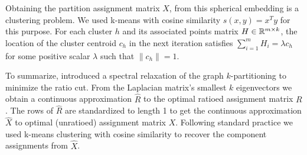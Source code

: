 Obtaining the partition assignment matrix $X$, from this spherical
embedding is a clustering problem. We used k-means with cosine
similarity $s(x,y) = x^T y$ for this purpose. For each cluster $h$
and its associated points matrix $H \in \mathbb{R}^{m \times k}$, the
location of the cluster centroid $c_h$ in the next iteration satisfies
$ \sum_{i=1}^m H_i = \lambda c_h $ for some positive scalar $\lambda$
such that $ \| c_h \| = 1$.

To summarize, \cite{Chan:94} introduced a spectral relaxation of the
graph $k$-partitioning to minimize the ratio cut. From the Laplacian
matrix's smallest $k$ eigenvectors we obtain a continuous approximation
$\hat{R}$ to the optimal ratioed assignment matrix $R$. The rows of
$\hat{R}$ are standardized to length 1 to get the continuous
approximation $\hat{X}$ to optimal (unratioed) assignment matrix $X$.
Following standard practice we used k-means clustering with cosine
similarity to recover the component assignments from $\hat{X}$.

